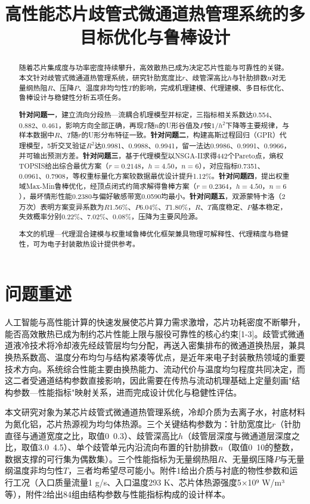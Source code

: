 \documentclass[withoutpreface]{cumcmthesis}
\title{高性能芯片歧管式微通道热管理系统的多目标优化与鲁棒设计}
\begin{document}
\maketitle

\begin{abstract}
随着芯片集成度与功率密度持续攀升，高效散热已成为决定芯片性能与可靠性的关键。本文针对歧管式微通道热管理系统，研究针肋宽度比$r$、歧管深高比$h$与针肋排数$n$对无量纲热阻$R$、压降$P$、温度非均匀性$T$的影响，完成机理建模、代理建模、多目标优化、鲁棒设计与稳健性分析五项任务。


\textbf{针对问题一}，建立流向分段热—流耦合机理模型并标定，三指标相关系数达0.554、0.882、0.461，影响方向全部正确，再现$T$随$n$的U形谷值及$P$按$1/h^2$下降等主要规律，与样本数据中$R$、$T$随$r$的U形分布特征一致。\textbf{针对问题二}，构建高斯过程回归（GPR）代理模型，5折交叉验证$R^2$达0.9981、0.9988、0.9941，留一法达0.9986、0.9991、0.9966，并可输出预测方差。\textbf{针对问题三}，基于代理模型以NSGA-II求得442个Pareto点，熵权TOPSIS给出综合最优方案（$r=0.2148$，$h=4.50$，$n=6$），对应指标0.7351、0.0961、0.7908，等权重标量化方案较数据最优设计提升1.12\%。\textbf{针对问题四}，提出权重域Max-Min鲁棒优化，经顶点闭式约简求解得鲁棒方案（$r=0.2364$，$h=4.50$，$n=6$），最坏情形性能0.2380与偏好敏感带宽0.0590均最小。\textbf{针对问题五}，双源蒙特卡洛（2万次）表明方案变异系数为$R$1.56\%、$P$6.04\%、$T$1.80\%，$R$、$T$高度稳定、$P$基本稳定，失效概率分别0.22\%、7.02\%、0.08\%，压降为主要风险源。


本文的机理—代理混合建模与权重域鲁棒优化框架兼具物理可解释性、代理精度与稳健性，可为电子封装散热设计提供参考。


\end{abstract}

\section{问题重述}
人工智能与高性能计算的快速发展使芯片算力需求激增，芯片功耗密度不断攀升，能否高效散热已成为制约芯片性能上限与服役可靠性的核心约束[1-3]。歧管式微通道液冷技术将冷却液先经歧管层均匀分配，再送入密集排布的微通道换热层，兼具换热系数高、温度分布均匀与结构紧凑等优点，是近年来电子封装散热领域的重要技术方向。系统综合性能主要由换热能力、流动代价与温度均匀程度共同决定，而这二者受通道结构参数直接影响，因此需要在传热与流动机理基础上定量刻画"结构参数—性能指标"映射关系，进而完成设计优化与稳健性评估。

本文研究对象为某芯片歧管式微通道热管理系统，冷却介质为去离子水，衬底材料为氮化铝，芯片热源视为均匀体热源。三个关键结构参数为：针肋宽度比$r$（针肋直径与通道宽度之比，取值0~0.3）、歧管深高比$h$（歧管层深度与微通道层深度之比，取值3.0~4.5）、单个歧管单元内沿流向布置的针肋排数$n$（取值0~10的整数，数据支撑的可行集为偶数集）。三个性能指标为无量纲热阻$R$、无量纲压降$P$与无量纲温度非均匀性$T$，三者均希望尽可能小。附件1给出介质与衬底的物性参数和运行工况（入口质量流量1 g/s、入口温度293 K、芯片体热源强度5×10⁹ W/m³等），附件2给出84组由结构参数与性能指标构成的设计样本。
\end{document}
